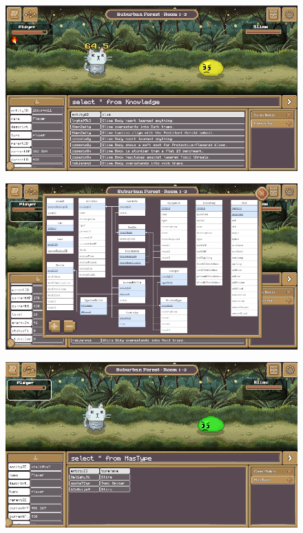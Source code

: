 \begin{figure}[H]
	\centering
	\includegraphics[width=13cm]{Images/gameplay4.png}
	\vspace{0.5cm}
	\caption{}
\end{figure}

\begin{figure}[H]
	\centering
	\includegraphics[width=13cm]{Images/gameplay5.png}
	\vspace{0.5cm}
	\caption{}
\end{figure}

\begin{figure}[H]
	\centering
	\includegraphics[width=13cm]{Images/gameplay6.png}
	\vspace{0.5cm}
	\caption{}
\end{figure}

